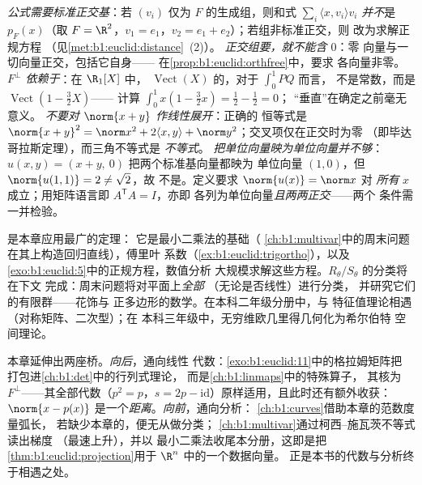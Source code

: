 \begin{remark}[常见误区]
\label{rem:b1:euclid:pitfalls}
\emph{公式需要标准正交基}：若
$(v_i)$ 仅为 $F$ 的生成组，则和式 $\sum_i\langle
x, v_i\rangle v_i$ \emph{并不}是 $p_F(x)$（取 $F = \R^2$，$v_1
= e_1$，$v_2 = e_1 + e_2$）；若组非标准正交，则
改为求解正规方程
（见\cref{met:b1:euclid:distance}~(2)）。
\emph{正交组要，就不能含 $0$}：零
向量与一切向量正交，包括它自身——
在\cref{prop:b1:euclid:orthfree}中，要求
各向量非零。
\emph{$F^\perp$ 依赖于}：在 $\R_1[X]$ 中，
$\operatorname{Vect}(X)$ 的，对于 $\int_0^1 PQ$ 而言，
不是常数，而是 $\operatorname{Vect}(1 - \frac32 X)$——
计算 $\int_0^1 x(1 - \frac32 x) = \frac12 - \frac12 = 0$；
“垂直”在确定之前毫无意义。
\emph{不要对 $\norm{x + y}$ 作线性展开}：正确的
恒等式是 $\norm{x+y}^2 = \norm x^2 + 2\langle x, y\rangle +
\norm y^2$；交叉项仅在正交时为零
（即毕达哥拉斯定理），而三角不等式是
\emph{不等式}。
\emph{把单位向量映为单位向量并不够}：$u(x,
y) = (x + y,\ 0)$ 把两个标准基向量都映为
单位向量 $(1, 0)$，但 $\norm{u(1,1)} = 2 \neq \sqrt2$，故
不是。定义要求 $\norm{u(x)} = \norm x$ 对
\emph{所有} $x$ 成立；用矩阵语言即 $A^{\mathsf T}A = I$，亦即
各列为单位向量\emph{且两两正交}——两个
条件需一并检验。
\end{remark}

\begin{remark}[内积的应用]
\label{rem:b1:euclid:whereused}
是本章应用最广的定理：
它是最小二乘法的基础（
\cref{ch:b1:multivar}中的周末问题在其上构造回归直线），傅里叶
系数（\cref{ex:b1:euclid:trigortho}），以及
\cref{exo:b1:euclid:5}中的正规方程，数值分析
大规模求解这些方程。$R_\theta / S_\theta$ 的分类将在下文
完成：周末问题将对平面上\emph{全部}
（无论是否线性）进行分类，
并研究它们的有限群——花饰与
正多边形的数学。在本科二年级分册中，与
特征值理论相遇（对称矩阵、二次型）；在
本科三年级中，无穷维欧几里得几何化为希尔伯特
空间理论。
\end{remark}

\begin{remark}[第 3 册内的几个视角]
\label{rem:b1:euclid:perspectives}
本章延伸出两座桥。\emph{向后}，通向线性
代数：\cref{exo:b1:euclid:11}中的格拉姆矩阵把
打包进\cref{ch:b1:det}中的行列式理论，
而是\cref{ch:b1:linmaps}中的特殊算子，
其核为
$F^\perp$——其全部代数（$p^2 = p$，$s = 2p -
\mathrm{id}$）原样适用，且此时还有额外收获：$\norm{x
- p(x)}$ 是一个\emph{距离}。\emph{向前}，通向分析：
\cref{ch:b1:curves}借助本章的范数度量弧长，
若缺少本章的，便无从做分类；
\cref{ch:b1:multivar}通过柯西–施瓦茨不等式读出梯度
（最速上升），并以
最小二乘法收尾本分册，这即是把\cref{thm:b1:euclid:projection}用于
$\R^n$ 中的一个数据向量。
正是本书的代数与分析终于相遇之处。
\end{remark}

